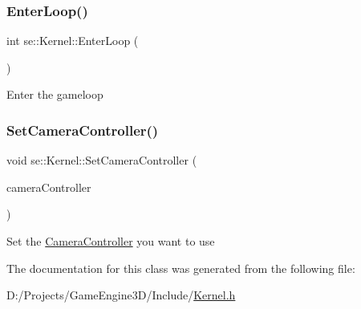 \subsubsection{\texorpdfstring{Enter\+Loop()}{EnterLoop()}}
{\footnotesize\ttfamily int se\+::\+Kernel\+::\+Enter\+Loop (\begin{DoxyParamCaption}{ }\end{DoxyParamCaption})}

Enter the gameloop \mbox{\label{classse_1_1_kernel_a60a807b4f4e928752e7512f5b7b4a17c}} 
\subsubsection{\texorpdfstring{Set\+Camera\+Controller()}{SetCameraController()}}
{\footnotesize\ttfamily void se\+::\+Kernel\+::\+Set\+Camera\+Controller (\begin{DoxyParamCaption}\item[{\mbox{\hyperlink{classse_1_1_camera_controller}{Camera\+Controller}} $\ast$}]{camera\+Controller }\end{DoxyParamCaption})}

Set the \mbox{\hyperlink{classse_1_1_camera_controller}{Camera\+Controller}} you want to use 

The documentation for this class was generated from the following file\+:\begin{DoxyCompactItemize}
\item 
D\+:/\+Projects/\+Game\+Engine3\+D/\+Include/\mbox{\hyperlink{_kernel_8h}{Kernel.\+h}}\end{DoxyCompactItemize}
